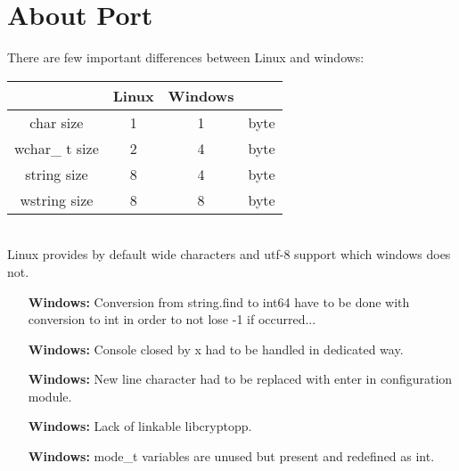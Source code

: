 \hypertarget{AboutPort}{
\section{About Port}
\label{AboutPort}
}

There are few important differences between Linux and windows:\\
\begin{tabular}{|c|c|c|c|}
\hline
  & Linux & Windows & \\ \hline
char size & 1 & 1 & byte\\ \hline
wchar\_ t size & 2 & 4 & byte\\ \hline
string size & 8 & 4 & byte\\ \hline
wstring size & 8 & 8 & byte\\ \hline
\end{tabular}\\
Linux provides by default wide characters and utf-8 support which windows does not.
\begin{itemize}
\item [\textbf{Windows:}]Conversion from string.find to int64 have to be done with conversion to int in order to not lose -1 if occurred...
\item [\textbf{Windows:}]Console closed by x had to be handled in dedicated way.
\item [\textbf{Windows:}]New line character had to be replaced with enter in configuration module.
\item [\textbf{Windows:}]Lack of linkable libcryptopp.
\item [\textbf{Windows:}]mode\_t variables are unused but present and redefined as int.
\end{itemize}

